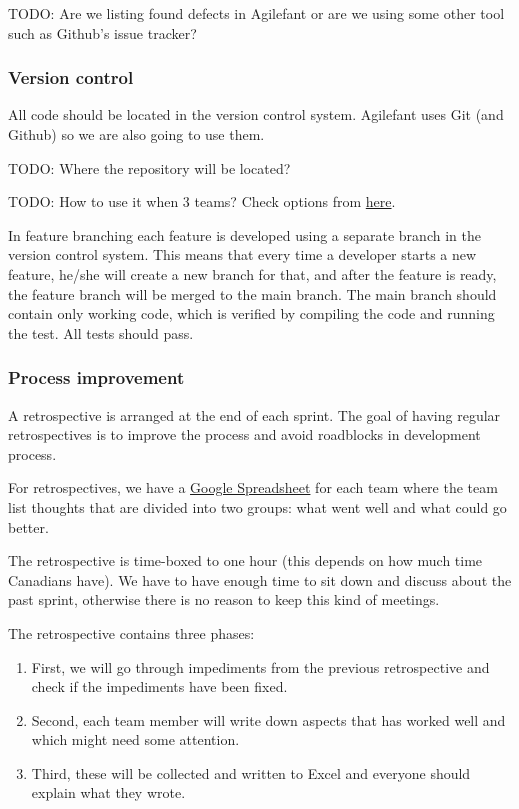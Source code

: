 TODO: Are we listing found defects in Agilefant or are we using some other tool such as Github's issue tracker?

\subsubsection{Version control}

All code should be located in the version control system.
Agilefant uses Git (and Github) so we are also going to use 
them.

TODO: Where the repository will be located?

TODO: How to use it when 3 teams? Check options from 
\href{https://www.atlassian.com/git/workflows}{here}.

In feature branching each feature is developed using a separate 
branch in the version control system. This means that every time 
a developer starts a new feature, he/she will create a new 
branch for that, and after the feature is ready, the feature 
branch will be merged to the main branch. The main branch should 
contain only working code, which is verified by compiling the 
code and running the test. All tests should pass.

\subsubsection{Process improvement}

A retrospective is arranged at the end of each sprint. The goal of having 
regular retrospectives is to improve the process and avoid roadblocks in 
development process.

For retrospectives, we have a \href{https://docs.google.com/spreadsheet/ccc?key=0Ahu59q_GwtcedGE1dnZtTHNzRDZ4YWR5aXp3NDhMcnc&usp=sharing}{Google Spreadsheet} for each team where the team list thoughts that are divided 
into two groups: what went well and what could go better. 

The retrospective is time-boxed to one hour (this depends on how much time 
Canadians have). We have to have enough time to sit down and discuss about the 
past sprint, otherwise there is no reason to keep this kind of meetings. 

The retrospective contains three phases:

\begin{enumerate}
\item First, we will go through impediments from the previous 
retrospective and check if the impediments have been fixed.
\item Second, each team member will write down aspects that has 
worked well and which might need some attention.
\item Third, these will be collected and written to Excel and 
everyone should explain what they wrote.
\end{enumerate}

